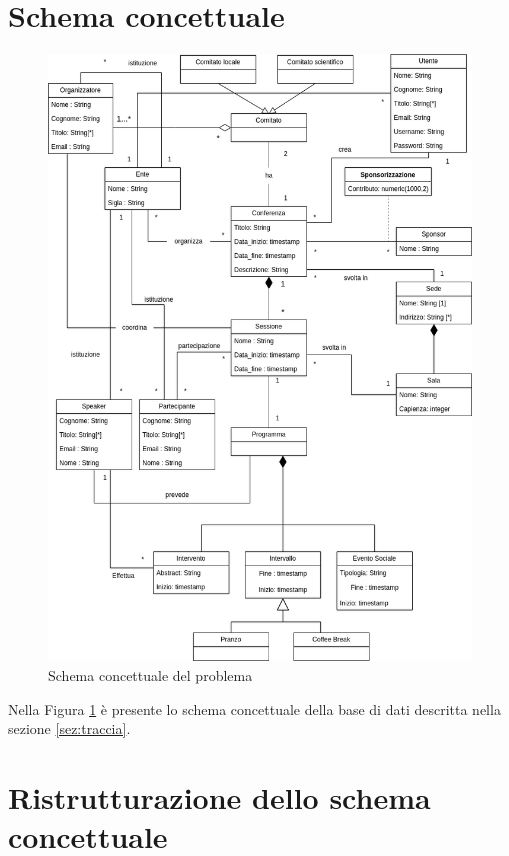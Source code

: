\section{Schema concettuale}

\begin{figure}[h!]
	\centering
	\includegraphics[scale=0.6]{Immagini/Schema_Concettuale.png}
	\caption{Schema concettuale del problema}\label{uml:schema_concettuale}
\end{figure}
Nella Figura \ref{uml:schema_concettuale} è presente lo schema concettuale della base di dati descritta nella sezione \ref{sez:traccia}.

\section{Ristrutturazione dello schema concettuale}


